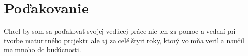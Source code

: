 \chapter*{Poďakovanie}

Chcel by som sa poďakovať svojej vedúcej práce nie len za pomoc a vedení pri tvorbe maturitného projektu ale aj za celé štyri roky, ktorý vo mňa veril a naučil ma mnoho do budúcnosti.

